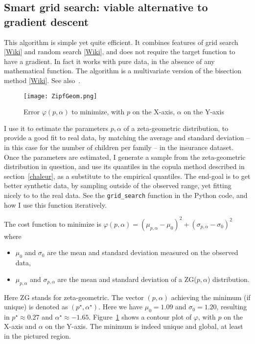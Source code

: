 \documentclass[oneside,10pt]{book}
\begin{document}
\subsection{Smart grid search: viable alternative to gradient descent}\label{butare}

This algorithm is simple yet quite efficient. It combines features of
\textcolor{index}{grid search} [\href{https://en.wikipedia.org/wiki/Hyperparameter_optimization}{Wiki}]
 and
\textcolor{index}{random search} [\href{https://en.wikipedia.org/wiki/Random_search}{Wiki}], and does not require the target function to have a gradient. In fact it works with pure data, in the absence of any
 mathematical function. The algorithm is a multivariate version of the
\textcolor{index}{bisection method} [\href{https://en.wikipedia.org/wiki/Bisection_method}{Wiki}]. See also~\cite{manulo17}.

\begin{figure}%
\centering
\texttt{[image: ZipfGeom.png]}
\caption{Error $\varphi(p,\alpha)$ to minimize, with $p$ on the X-axis, $\alpha$ on the Y-axis}
\label{fig:pytz238675}
\end{figure}

I use it to estimate the parameters $p,\alpha$ of a zeta-geometric distribution, to provide a good fit to real data, by matching the
 average and standard deviation -- in this case for the number of children per family -- in the insurance dataset. Once the parameters are estimated, I generate a sample from the zeta-geometric distribution in question, and use its quantiles in the copula method described
 in section~\ref{chaleur}, as a substitute to the empirical quantiles. The end-goal is to get better synthetic data, by sampling outside of the observed range, yet fitting nicely to to the real data.
See the \texttt{grid\_search} function in the Python code, and how I use this function iteratively.



\noindent The cost function to minimize is
$\varphi(p,\alpha) =(\mu_{p,\alpha}-\mu_0)^2 + (\sigma_{p,\alpha}-\sigma_0)^2$
where \vspace{1ex}

\begin{itemize}
\item $\mu_0$ and $\sigma_0$ are the mean and standard deviation measured on the observed data,
\item $\mu_{p,\alpha}$ and $\sigma_{p,\alpha}$ are the mean and standard deviation of a ZG($p,\alpha$) distribution.
\end{itemize}\vspace{1ex}
Here ZG stands for zeta-geometric. The vector $(p,\alpha)$ achieving the minimum (if unique) is
 denoted as $(p^\star,\alpha^\star)$. Here we have $\mu_0 = 1.09$ and $\sigma_0 = 1.20$,
 resulting in $p^\star\approx 0.27$ and $\alpha^\star\approx -1.65$. Figure~\ref{fig:pytz238675} shows a contour plot of $\varphi$,
 with $p$ on the X-axis and $\alpha$ on the Y-axis. The minimum is indeed unique and global, at least in the
 pictured region.
\end{document}
